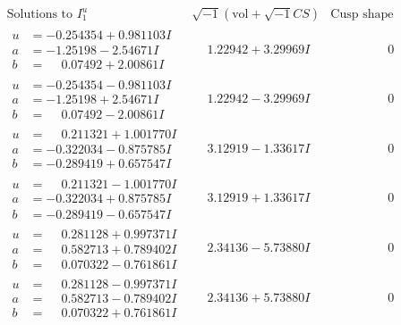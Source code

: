 \documentclass[1p]{elsarticle_modified}
\theoremstyle{definition}
\newcommand{\I}{\sqrt{-1}}
\begin{document}
$$\begin{array}{c|c|c}  
\text{Solutions to }I^u_{1}& \I (\text{vol} + \sqrt{-1}CS) & \text{Cusp shape}\\
 \hline 
\begin{aligned}
u &= -0.254354 + 0.981103 I \\
a &= -1.25198 - 2.54671 I \\
b &= \phantom{-}0.07492 + 2.00861 I\end{aligned}
 & \phantom{-}1.22942 + 3.29969 I & \phantom{-0.000000 } 0 \\ \hline\begin{aligned}
u &= -0.254354 - 0.981103 I \\
a &= -1.25198 + 2.54671 I \\
b &= \phantom{-}0.07492 - 2.00861 I\end{aligned}
 & \phantom{-}1.22942 - 3.29969 I & \phantom{-0.000000 } 0 \\ \hline\begin{aligned}
u &= \phantom{-}0.211321 + 1.001770 I \\
a &= -0.322034 - 0.875785 I \\
b &= -0.289419 + 0.657547 I\end{aligned}
 & \phantom{-}3.12919 - 1.33617 I & \phantom{-0.000000 } 0 \\ \hline\begin{aligned}
u &= \phantom{-}0.211321 - 1.001770 I \\
a &= -0.322034 + 0.875785 I \\
b &= -0.289419 - 0.657547 I\end{aligned}
 & \phantom{-}3.12919 + 1.33617 I & \phantom{-0.000000 } 0 \\ \hline\begin{aligned}
u &= \phantom{-}0.281128 + 0.997371 I \\
a &= \phantom{-}0.582713 + 0.789402 I \\
b &= \phantom{-}0.070322 - 0.761861 I\end{aligned}
 & \phantom{-}2.34136 - 5.73880 I & \phantom{-0.000000 } 0 \\ \hline\begin{aligned}
u &= \phantom{-}0.281128 - 0.997371 I \\
a &= \phantom{-}0.582713 - 0.789402 I \\
b &= \phantom{-}0.070322 + 0.761861 I\end{aligned}
 & \phantom{-}2.34136 + 5.73880 I & \phantom{-0.000000 } 0 \\ \hline\begin{aligned}

\end{aligned}
\end{array}$$
\end{document}
